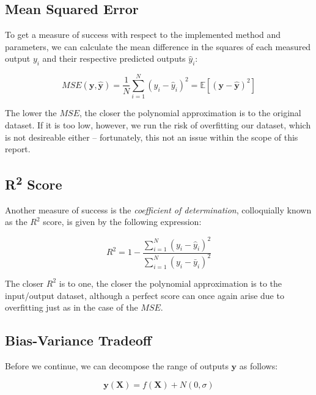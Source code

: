 \documentclass[a4paper,10pt,english]{article}
\begin{document}
	\subsection*{Mean Squared Error}
	
	To get a measure of success with respect to the implemented method and parameters, we can calculate the mean difference in the squares of each measured output $y_i$ and their respective predicted outputs $\hat{y}_i$:
	
	\begin{equation}
	MSE(\mathbf{y}, \mathbf{\hat{y}}) = \frac{1}{N} \sum_{i=1}^{N} (y_i - \hat{y}_i)^2 = \mathbb{E}\left[(\mathbf{y}-\hat{\mathbf{y}})^{2}\right]
	\end{equation}
	
	The lower the $MSE$, the closer the polynomial approximation is to the original dataset.  If it is too low, however, we run the risk of overfitting our dataset, which is not desireable either – fortunately, this not an issue within the scope of this report.
	
	\subsection*{R\textsuperscript{2} Score}
	
	Another measure of success is the \textit{coefficient of determination}, colloquially known as the $R^2$ score, is given by the following expression:
	
	\begin{equation}
	R^2 = 1 - \frac{\sum_{i=1}^N (y_i - \hat{y}_i)^2 }{\sum_{i=1}^N (y_i - \bar{y}_i)^2 }
	\end{equation}
	
	The closer $R^2$ is to one, the closer the polynomial approximation is to the input/output dataset, although a perfect score can once again arise due to overfitting just as in the case of the $MSE$.
	
	\subsection*{Bias-Variance Tradeoff}
	
	Before we continue, we can decompose the range of outputs $\mathbf{y}$ as follows:
	
	\begin{equation}
	\label{eq_method_5}
	\mathbf{y}(\mathbf{X}) = f(\mathbf{X}) + N(0, \sigma) 
	\end{equation}
	
\end{document}
